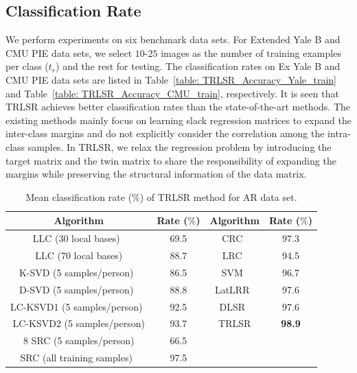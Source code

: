 \subsection{Classification Rate}
%
We perform experiments on six benchmark data sets. For Extended Yale B and CMU PIE data sets, we select $10$-$25$ images as the number of training examples per class ($t_r$) and the rest for testing. The classification rates on Ex Yale B and CMU PIE data sets are listed in Table~\ref{table: TRLSR_Accuracy_Yale_train} and Table~\ref{table: TRLSR_Accuracy_CMU_train}, respectively. It is seen that TRLSR achieves better classification rates than the state-of-the-art methods. The existing methods mainly focus on learning slack regression matrices to expand the inter-class margins and do not explicitly consider the correlation among the intra-class samples. In TRLSR, we relax the regression problem by introducing the target matrix and the twin matrix to share the responsibility of expanding the margins while preserving the structural information of the data matrix.
\begin{table}
\caption{Mean classification rate ($\%$) of TRLSR method for AR data set.}
\label{table: TRLSR_Accuracy_AR}
\centering
\small
\begin{tabular}{|c|c||c|c|}
\hline
Algorithm & Rate ($\%$) & Algorithm & Rate ($\%$)\\ 
\hline
LLC (30 local bases)~\cite{LLC} & 69.5 & CRC~\cite{CRC} & 97.3\\ 
\hline
LLC (70 local bases) & 88.7 & LRC~\cite{LRC} & 94.5\\ 
\hline
K-SVD (5 samples/person)~\cite{KSVD} & 86.5 & SVM~\cite{SVM} & 96.7\\ 
\hline
D-SVD (5 samples/person)~\cite{DKSVD} & 88.8 & LatLRR~\cite{LatLRR} & 97.6\\ 
\hline
LC-KSVD1 (5 samples/person)~\cite{LCKSVD} & 92.5 & DLSR~\cite{DLSR} & 97.6\\ 
\hline
LC-KSVD2 (5 samples/person) & 93.7 & TRLSR & \textbf{98.9}\\
\hline8
SRC (5 samples/person) & 66.5 & & \\
\hline
SRC (all training samples)~\cite{SRC} & 97.5 & & \\
\hline
\end{tabular}
\end{table}
